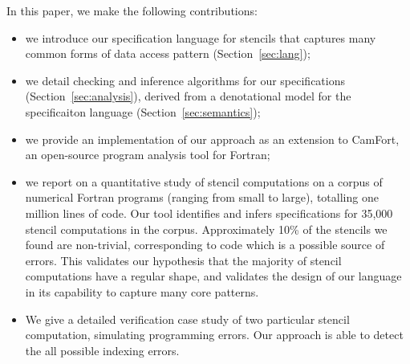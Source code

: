 \documentclass{article}
\begin{document}
In this paper, we make the following contributions:
%
\begin{itemize}
\item we introduce our specification language for stencils
  that captures many common forms of data access pattern
  (Section~\ref{sec:lang});

\item we detail checking and inference algorithms for our
  specifications (Section~\ref{sec:analysis}), derived from a
  denotational model for the specificaiton language
  (Section~\ref{sec:semantics});

\item we provide an implementation of our approach as an extension to
  CamFort, an open-source program analysis tool for Fortran;

\item we report on a quantitative study of stencil computations on a
  corpus of numerical Fortran programs (ranging from small to large),
  totalling one million lines of code. Our tool identifies and infers
  specifications for 35,000 stencil computations in the
  corpus. Approximately 10\% of the stencils we found are non-trivial,
  corresponding to code which is a possible source of errors. This
  validates our hypothesis that the majority of stencil computations have a
  regular shape, and validates the design of our language in its
  capability to capture many core patterns.

\item We give a detailed verification case study of two
  particular stencil computation, simulating programming errors.
  Our approach is able to detect the all possible
  indexing errors.
\end{itemize}
%
\end{document}
